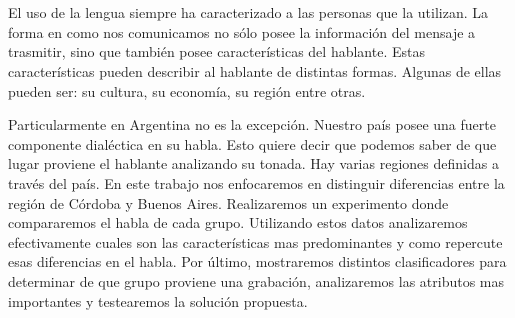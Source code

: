 \chapter*{\runtitulo}

\noindent 

El uso de la lengua siempre ha caracterizado a las personas que la utilizan. La forma en como nos comunicamos no sólo posee la información del mensaje a trasmitir, sino que también posee características del hablante. Estas características pueden describir al hablante de distintas formas. Algunas de ellas pueden ser: su cultura, su economía, su región entre otras. 

Particularmente en Argentina no es la excepción. Nuestro país posee una fuerte componente dialéctica en su habla. Esto quiere decir que podemos saber de que lugar proviene el hablante analizando su tonada. Hay varias regiones definidas a través del país. En este trabajo nos enfocaremos en distinguir diferencias entre la región de Córdoba y Buenos Aires. Realizaremos un experimento donde compararemos el habla de cada grupo. Utilizando estos datos analizaremos efectivamente cuales son las características mas predominantes y como repercute esas diferencias en el habla. Por último, mostraremos distintos clasificadores para determinar de que grupo proviene una grabación, analizaremos las atributos mas importantes y testearemos la solución propuesta. 

\bigskip
